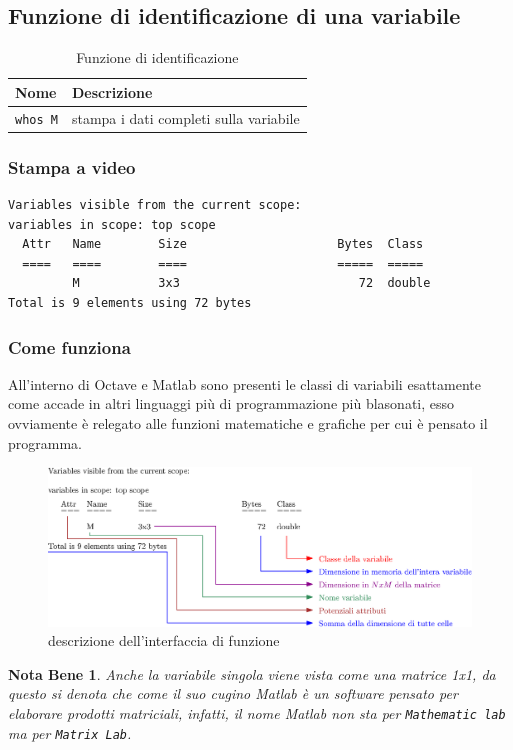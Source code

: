 \documentclass{book}
\newtheorem{notab}{Nota Bene}
\begin{document}
\subsection{Funzione di identificazione di una variabile}
\label{sec:funiden}
\begin{table}[ht]
  \centering
  \begin{tabular}[tab:funzionediid]{ll}
    {\bf Nome} & {\bf Descrizione} \\\hline
    \lstinline|whos M| & stampa i dati completi sulla variabile
  \end{tabular}
  \caption{Funzione di identificazione}
  \label{tab:funzionediid}
\end{table}
\subsubsection{Stampa a video}
\label{sec:stampiden}
\begin{small}
\begin{verbatim}
Variables visible from the current scope:
variables in scope: top scope
  Attr   Name        Size                     Bytes  Class
  ====   ====        ====                     =====  =====
         M           3x3                         72  double
Total is 9 elements using 72 bytes
\end{verbatim}
\end{small}
\clearpage

\subsubsection{Come funziona}
All'interno di Octave e Matlab sono presenti le classi di variabili
esattamente come accade in altri linguaggi più di programmazione più blasonati,
esso ovviamente è relegato alle funzioni matematiche e grafiche per cui è
pensato il programma.
\begin{figure}[ht]
  \centering
  \includegraphics[width=15cm]{img/finiti/whos.eps}
  \caption{descrizione dell'interfaccia di funzione}
  \label{fig:interffun}
\end{figure}
\begin{notab}
  Anche la variabile singola viene vista come una matrice 1x1, da questo si
  denota che come il suo cugino Matlab è un software pensato per elaborare
  prodotti matriciali, infatti, il nome Matlab non sta per \texttt{Mathematic
    lab} ma per \texttt{Matrix Lab}. 
\end{notab}
\end{document}
